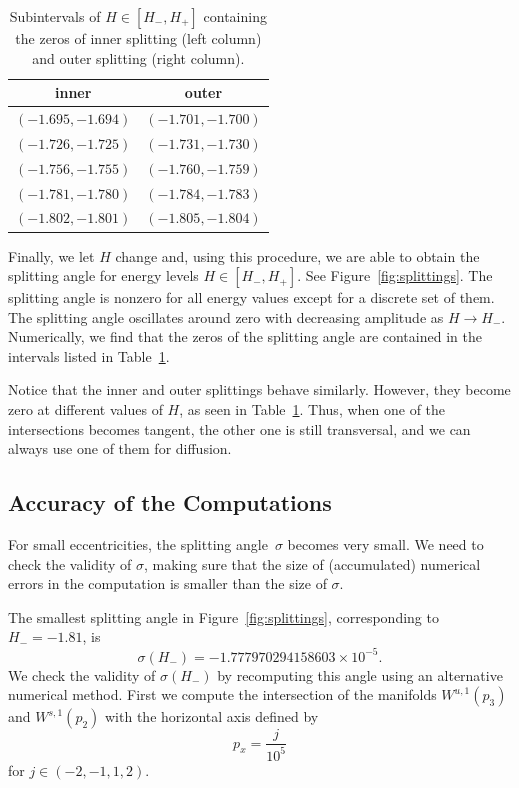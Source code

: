 \begin{table}
\begin{tabular}{|c|c|}
\hline
inner & outer \\
\hline
$ ( -1.695,-1.694 ) $ & $ ( -1.701,-1.700 ) $ \\
$ ( -1.726,-1.725 ) $ & $( -1.731,-1.730 ) $ \\
$ ( -1.756,-1.755 ) $ & $ ( -1.760,-1.759 ) $ \\
$ ( -1.781,-1.780 ) $ & $ ( -1.784,-1.783 ) $ \\
$ ( -1.802,-1.801 ) $ & $ ( -1.805,-1.804 ) $ \\
\hline
\end{tabular}
\caption{Subintervals of $H\in[H_-,H_+]$ containing the zeros of inner
splitting (left column) and outer splitting (right column).}
\label{tab:zeros_inner_outer}
\end{table}



Finally, we let $H$ change and, using this procedure, we are able to
obtain the splitting angle for energy levels $H \in [H_-, H_+]$.
See Figure~\ref{fig:splittings}.
The splitting angle is nonzero for all energy values except for a
discrete set of them.  
The splitting angle oscillates around zero with decreasing amplitude
as $H\to H_-$.
Numerically, we find that the zeros of the splitting angle are
contained in the intervals listed in
Table~\ref{tab:zeros_inner_outer}.

Notice that the inner and outer splittings behave similarly.
However, they become zero at different values of $H$, as seen in
Table~\ref{tab:zeros_inner_outer}.
Thus, when one of the intersections becomes tangent, the other one is
still transversal, and we can always use one of them for diffusion. 


\subsection{Accuracy of the Computations}
\label{sec:accuracy_computations}

For small eccentricities, the splitting angle~$\sigma$ becomes very
small.
We need to check the validity of $\sigma$, making sure that the size
of (accumulated) numerical errors in the computation is smaller than
the size of $\sigma$.

The smallest splitting angle in Figure~\ref{fig:splittings},
corresponding to $H_-=-1.81$, is
\[ \sigma(H_-)= -1.777970294158603 \times 10^{-5}. \]
We check the validity of $\sigma(H_-)$ by recomputing this angle using
an alternative numerical method.
First we compute the intersection of the manifolds $W^{u,1}(p_3)$ and
$W^{s,1}(p_2)$ with the horizontal axis defined by
\[ p_x = \frac{j}{10^{5}} \]
for $j\in (-2,-1,1,2)$.

